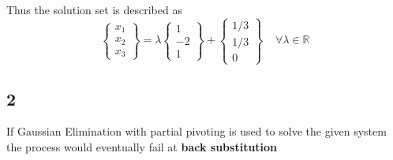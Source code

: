 \documentclass[11pt]{article}
\begin{document}
Thus the solution set is described as 
\[ 
\begin{Bmatrix}
x_1\\
x_2\\
x_3
\end{Bmatrix}
= 
\lambda
\begin{Bmatrix}
1\\-2\\1
\end{Bmatrix} 
+ 
\begin{Bmatrix}
1/3\\
1/3\\
0
\end{Bmatrix}
\ \ \ \ \ \forall \lambda \in \mathbb{R}
\]
\subsection*{2}
If Gaussian Elimination with partial pivoting is used to solve the given system the process would eventually fail at {\bf back substitution}
\end{document}
